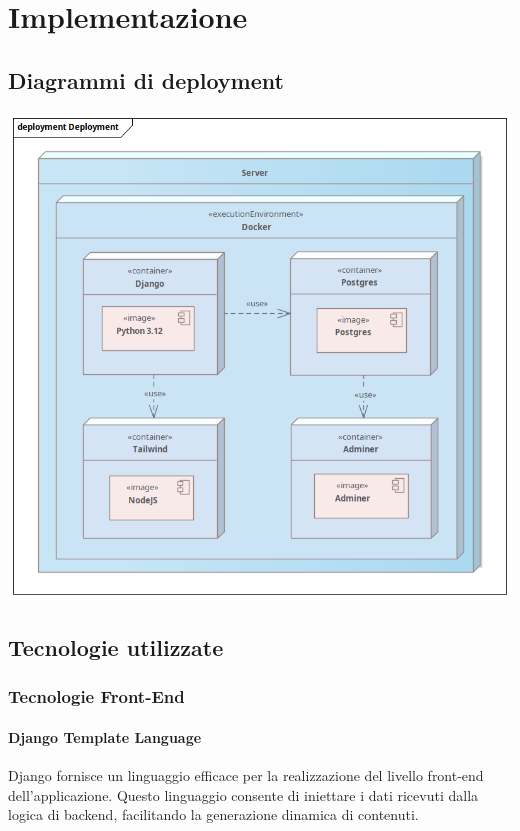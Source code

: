 \chapter{Implementazione}
\label{ch:Progettazione}

\section{Diagrammi di deployment}

\begin{center}
  \includegraphics[width=\textwidth]{immagini/Implementazione/Deployment.png}
\end{center}

\clearpage

\section{Tecnologie utilizzate}

\subsection{Tecnologie Front-End}
\subsubsection{Django Template Language}
Django fornisce un linguaggio efficace per la realizzazione del livello front-end dell'applicazione. Questo linguaggio consente di iniettare i dati ricevuti dalla logica di backend, facilitando la generazione dinamica di contenuti.

